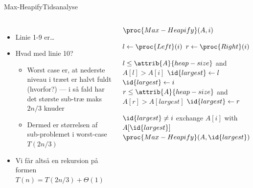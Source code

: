 \documentclass[aspectratio=1610]{beamer}
\begin{document}
\begin{frame}{Max-Heapify}{Tidsanalyse}
    \begin{columns}
        \begin{itemize}
            \item<1-> Linie 1-9 er\ldots {}
            \item<3-> Hvad med linie 10?
                \begin{itemize}
                    \item<4-> Worst case er, at nederste niveau i træet er halvt
                        fuldt (hvorfor?) --- i så fald har det største sub-træ
                        maks $2n/3$ knuder
                    \item<5-> Dermed er størrelsen af sub-problemet i worst-case
                        $T(2n/3)$
                \end{itemize}
            \item<6-> Vi får altså en rekursion på formen $T(n) = T(2n/3) +
                \Theta(1)$
        \end{itemize}
    
        \begin{block}{$\proc{Max-Heapify}(A, i)$}
            
            \vspace{-\abovedisplayskip}
            \begin{codebox}
                \li $l \gets \proc{Left}(i)$
                \li $r \gets \proc{Right}(i)$
                
                \li \If $l \leq \attrib{A}{heap-size}$ and $A[l] > A[i]$
                    \Then
                \li     $\id{largest} \gets l$
                \li \Else 
                        $\id{largest} \gets i$
                    \End
                \li \If $r \leq \attrib{A}{heap-size}$ and $A[r] > A[largest]$
                    \Then
                \li     $\id{largest} \gets r$
                    \End
                
                \li \If $\id{largest} \neq i$
                    \Then
                \li     exchange $A[i]$ with $A[\id{largest}]$
                \li     $\proc{Max-Heapify}(A, \id{largest})$
                    \End
            \end{codebox}
        \end{block}
    \end{columns}
\end{frame}
\end{document}
